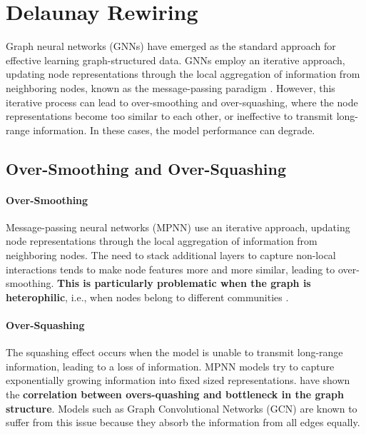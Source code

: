\documentclass{article}
\theoremstyle{plain}
\theoremstyle{definition}
\theoremstyle{remark}
\begin{document}

\section{Delaunay Rewiring}
\label{delaunay}
Graph neural networks (GNNs) have emerged as the standard approach for effective
learning graph-structured data. GNNs employ an iterative approach, updating node 
representations through the local aggregation of information from
neighboring nodes, known as the message-passing paradigm \cite{gilmer2017neural}.
However, this iterative process can lead to over-smoothing and over-squashing, where
the node representations become too similar to each other, or ineffective to 
transmit long-range information. In these cases, the model performance can degrade.

\subsection{Over-Smoothing and Over-Squashing}

\paragraph{Over-Smoothing}
Message-passing neural networks (MPNN) use an 
iterative approach, updating node representations through 
the local aggregation of information from neighboring nodes.
The need to stack additional layers to capture non-local interactions
tends to make node features more and
more similar, leading to over-smoothing. \textbf{This is particularly problematic 
when the graph is heterophilic}, i.e., when nodes belong to different communities 
\cite{zheng2022graph}.

\paragraph{Over-Squashing}
The squashing effect occurs when the model is unable to transmit
long-range information, leading to a loss of information. MPNN models try to 
capture exponentially growing information into fixed sized representations. 
\cite{alon2021bottleneck} have shown the \textbf{correlation between overs-quashing and 
 bottleneck in the graph structure}.
Models such as Graph Convolutional Networks (GCN) are known to suffer from this issue
because they absorb  the information from all edges equally.
\end{document}
